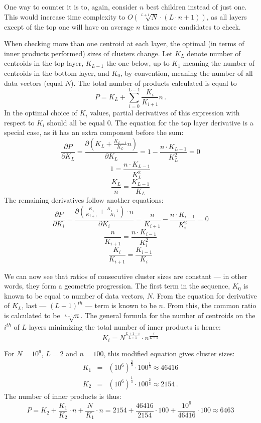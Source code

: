 One way to counter it is to, again, consider $n$ best children instead of
just one. This would increase time complexity to 
$ O(\sqrt[L+1]{N} \cdot (L \cdot n + 1)) $, as all layers except of the top one
will have on average $n$ times more candidates to check.

When checking more than one centroid at each layer, the optimal (in terms
of inner products performed) sizes of clusters change. Let $ K_L $ denote
number of centroids in the top layer, $ K_{L-1} $ the one below, up to
$ K_1 $ meaning the number of centroids in the bottom layer, and $ K_0 $, by 
convention, meaning the number of all data vectors (equal $N$). The total number of
products calculated is equal to 
$$ P = K_L + \sum_{i=0}^{L-1} \frac{K_i}{K_{i+1}}  n \,.$$
In the optimal choice of $K_i$ values, partial derivatives of this expression
with respect to $K_i$ should all be equal 0. The equation for the top layer 
derivative is a special case, as it has an extra component before the sum:
$$ 
\frac{\partial P}{\partial K_L} = 
\frac{\partial (K_L + \frac{K_{L-1}}{K_L} n)}{\partial K_L} =
1 -\frac{n \cdot K_{L-1}}{K_L^2} = 
0
$$
$$
1 = \frac{n \cdot K_{L-1}}{K_L^2}
$$
$$
\frac{K_L}{n} = \frac{K_{L-1}}{K_L}
$$
The remaining derivatives follow another equations:
$$
\frac{\partial P}{\partial K_i} =
\frac{\partial (\frac{K_i}{K_{i+1}} + \frac{K_{i-1}}{K_i}) \cdot n}{\partial K_i} =
\frac{n}{K_{i+1}} - \frac{n \cdot K_{i-1}}{K_i^2} = 0
$$
$$
\frac{n}{K_{i+1}} = \frac{n \cdot K_{i-1}}{K_i^2}
$$
$$
\frac{K_i}{K_{i+1}} = \frac{K_{i-1}}{K_i}
$$

We can now see that ratios of consecutive cluster sizes are constant --- in other
words, they form a geometric progression. The first term in the sequence,
$K_0$ is known to be equal to number of data vectors, $N$. From the equation
for derivative of $K_L$, last --- $(L+1)^{th}$ --- term is known to be $n$. From this,
the common ratio is calculated to be $\sqrt[L+1]{n}$. The general formula
for the number of centroids on the $i^{th}$ of $L$ layers minimizing the total number of
inner products is hence:
$$
K_i = N^{\frac{L+1-i}{L+1}} \cdot n^\frac{i}{L+1}
$$

For $N = 10^6$, $L = 2$ and $n = 100$, this modified equation gives cluster sizes:
\begin{eqnarray*}
K_1 & = & (10^6)^{\frac{2}{3}} \cdot 100^\frac{1}{3} \approx 46416 \\
K_2 & = & (10^6)^{\frac{1}{3}} \cdot 100^\frac{2}{3} \approx 2154 \,.
\end{eqnarray*}
The number of inner products is thus:
$$ 
P = K_2 + \frac{K_1}{K_2} \cdot n + \frac{N}{K_1} \cdot n =
2154 + \frac{46416}{2154} \cdot 100 + \frac{10^6}{46416} \cdot 100 \approx
6463
$$

